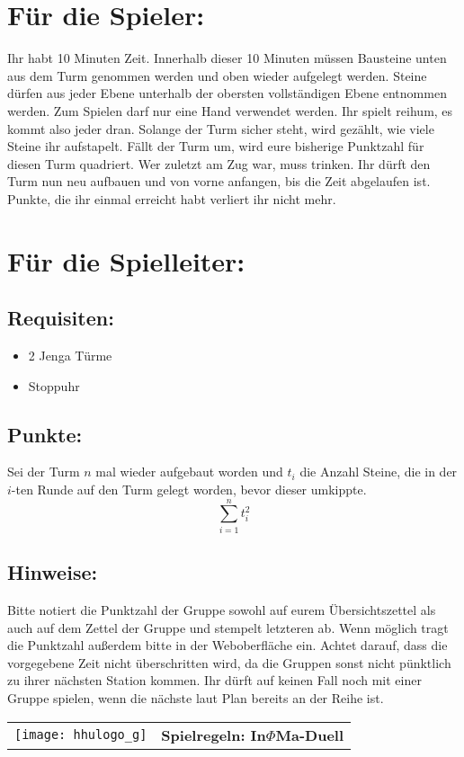 \documentclass[a4paper,10pt]{article}
\def\spield{In$\Phi $Ma-Duell}
\newcommand{\unten}{
 Bitte notiert die Punktzahl der Gruppe sowohl auf eurem Übersichtszettel als auch auf dem Zettel der Gruppe und stempelt letzteren ab. Wenn möglich tragt die Punktzahl außerdem bitte in der Weboberfläche ein.
 Achtet darauf, dass die vorgegebene Zeit nicht überschritten wird, da die Gruppen sonst nicht pünktlich zu ihrer nächsten Station kommen. Ihr dürft auf keinen Fall noch mit einer Gruppe spielen, wenn die nächste laut Plan bereits an der Reihe ist.
}
\begin{document}
\section*{Für die Spieler:}
Ihr habt 10 Minuten Zeit. Innerhalb dieser 10 Minuten müssen Bausteine unten aus dem Turm genommen werden und oben wieder aufgelegt werden. Steine dürfen aus jeder Ebene unterhalb der obersten vollständigen Ebene entnommen werden. Zum Spielen darf nur eine Hand verwendet werden. Ihr spielt reihum, es kommt also jeder dran. Solange der Turm sicher steht, wird gezählt, wie viele Steine ihr aufstapelt. Fällt der Turm um, wird eure bisherige Punktzahl für diesen Turm quadriert. Wer zuletzt am Zug war, muss trinken. Ihr dürft den Turm nun neu aufbauen und von vorne anfangen, bis die Zeit abgelaufen ist. Punkte, die ihr einmal erreicht habt verliert ihr nicht mehr.

\section*{Für die Spielleiter:}
\subsection*{Requisiten:}
\begin{itemize}
 \item 2 Jenga Türme
 \item Stoppuhr
\end{itemize}
\subsection*{Punkte:}
Sei der Turm $n$ mal wieder aufgebaut worden und $t_i$ die Anzahl Steine, die in der $i$-ten Runde auf den Turm gelegt worden, bevor dieser umkippte.
 $$\sum_{i=1}^{n}t_i^2$$

\subsection*{Hinweise:}
\unten

\newpage


  \begin{tabularx}{\textwidth}{lc}
    \texttt{[image: hhulogo\_g]}
  & {\Huge \textbf{Spielregeln: \spield}}
  \end{tabularx}\\

\Large
\end{document}
